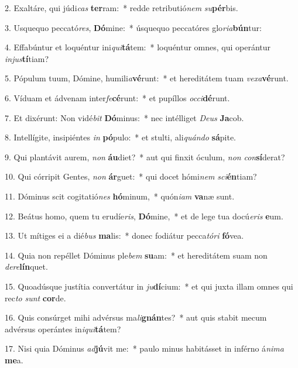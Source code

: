 2. Exaltáre, qui júdi\textit{cas} \textbf{ter}ram:~*  redde retributió\textit{nem} \textit{su}\textbf{pér}bis.\

3. Usquequo peccató\textit{res}, \textbf{Dó}mine:~*  úsquequo peccatóres glo\textit{ri}\textit{a}\textbf{bún}tur:\

4. Effabúntur et loquéntur ini\textit{qui}\textbf{tá}tem:~*  loquéntur omnes, qui operántur \textit{in}\textit{jus}\textbf{tí}tiam?\

5. Pópulum tuum, Dómine, humili\textit{a}\textbf{vé}runt:~*  et hereditátem tuam \textit{ve}\textit{xa}\textbf{vé}runt.\

6. Víduam et ádvenam inter\textit{fe}\textbf{cé}runt:~*  et pupíllos \textit{oc}\textit{ci}\textbf{dé}runt.\

7. Et dixérunt: Non vidé\textit{bit} \textbf{Dó}minus:~*  nec intélliget \textit{De}\textit{us} \textbf{Ja}cob.\

8. Intellígite, insipiéntes \textit{in} \textbf{pó}pulo:~*  et stulti, ali\textit{quán}\textit{do} \textbf{sá}pite.\

9. Qui plantávit aurem, \textit{non} \textbf{áu}diet?~*  aut qui finxit óculum, \textit{non} \textit{con}\textbf{sí}derat?\

10. Qui córripit Gentes, \textit{non} \textbf{ár}guet:~*  qui docet hómi\textit{nem} \textit{sci}\textbf{én}tiam?\

11. Dóminus scit cogitatió\textit{nes} \textbf{hó}minum,~*  quón\textit{i}\textit{am} \textbf{va}næ sunt.\

12. Beátus homo, quem tu erudíe\textit{ris}, \textbf{Dó}mine,~*  et de lege tua docú\textit{e}\textit{ris} \textbf{e}um.\

13. Ut mítiges ei a dié\textit{bus} \textbf{ma}lis:~*  donec fodiátur pecca\textit{tó}\textit{ri} \textbf{fó}vea.\

14. Quia non repéllet Dóminus ple\textit{bem} \textbf{su}am:~*  et hereditátem suam non \textit{de}\textit{re}\textbf{lín}quet.\

15. Quoadúsque justítia convertátur in \textit{ju}\textbf{dí}cium:~*  et qui juxta illam omnes qui rec\textit{to} \textit{sunt} \textbf{cor}de.\

16. Quis consúrget mihi advérsus ma\textit{li}\textbf{gnán}tes?~*  aut quis stabit mecum advérsus operántes in\textit{i}\textit{qui}\textbf{tá}tem?\

17. Nisi quia Dóminus \textit{ad}\textbf{jú}vit me:~*  paulo minus habitásset in inférno á\textit{ni}\textit{ma} \textbf{me}a.\

